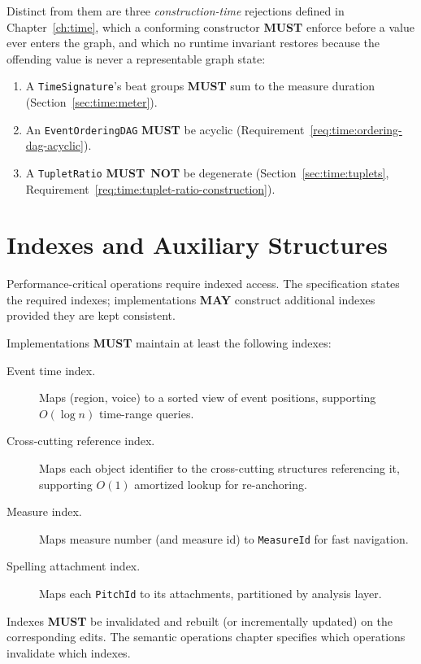 \documentclass[11pt,letterpaper]{report}
\newcounter{requirement}[chapter]
\newcommand{\MUST}{\textbf{MUST}}
\newcommand{\MUSTNOT}{\textbf{MUST}\nobreak\ \textbf{NOT}}
\newcommand{\MAY}{\textbf{MAY}}
\begin{document}
Distinct from them are three \emph{construction-time} rejections
defined in Chapter~\ref{ch:time}, which a conforming constructor
\MUST{} enforce before a value ever enters the graph, and which no
runtime invariant restores because the offending value is never a
representable graph state:

\begin{enumerate}
  \item A \texttt{TimeSignature}'s beat groups \MUST{} sum to the
    measure duration (Section~\ref{sec:time:meter}).
  \item An \texttt{EventOrderingDAG} \MUST{} be acyclic
    (Requirement~\ref{req:time:ordering-dag-acyclic}).
  \item A \texttt{TupletRatio} \MUSTNOT{} be degenerate
    (Section~\ref{sec:time:tuplets},
    Requirement~\ref{req:time:tuplet-ratio-construction}).
\end{enumerate}

\section{Indexes and Auxiliary Structures}
\label{sec:graph:indexes}

Performance-critical operations require indexed access. The
specification states the required indexes; implementations \MAY{}
construct additional indexes provided they are kept consistent.

\begin{requirement}
  \label{req:graph:required-indexes}
  Implementations \MUST{} maintain at least the following indexes:

  \begin{description}
    \item[Event time index.] Maps (region, voice) to a sorted view
      of event positions, supporting $O(\log n)$ time-range queries.
    \item[Cross-cutting reference index.] Maps each object identifier
      to the cross-cutting structures referencing it, supporting
      $O(1)$ amortized lookup for re-anchoring.
    \item[Measure index.] Maps measure number (and measure id) to
      \texttt{MeasureId} for fast navigation.
    \item[Spelling attachment index.] Maps each \texttt{PitchId} to
      its attachments, partitioned by analysis layer.
  \end{description}

  Indexes \MUST{} be invalidated and rebuilt (or incrementally
  updated) on the corresponding edits. The semantic operations
  chapter specifies which operations invalidate which indexes.
\end{requirement}
\end{document}
